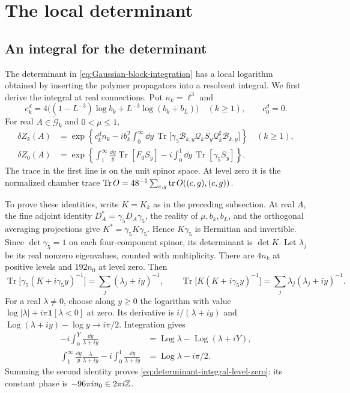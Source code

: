 \section{The local determinant}\label{sec:local-determinant}

\subsection{An integral for the determinant}\label{subsec:determinant-integral}

The determinant in \eqref{eq:Gaussian-block-integration} has a local
logarithm obtained by inserting the polymer propagators into a
resolvent integral. We first derive the integral at real connections.
Put $n_k=\ell^3$ and
\[
 c_k^d=4\bigl((1-L^{-3})\log b_k+L^{-3}\log(b_k+b_L)\bigr)
       \quad(k\ge1),\qquad c_0^d=0.
\]
For real $A\in\widetilde{\mathcal G}_k$ and $0<\mu\le1$,
\begin{align}
 \delta Z_k(A)
  &=\exp\left\{c_k^dn_k-ib_k^2\int_0^\infty\dd y\,
       \operatorname{Tr}\bigl[\gamma_5\mathcal B_{k,y}
          \mathcal Q_kS_y\mathcal Q_k^\sharp\mathcal B_{k,y}\bigr]
                        \right\}\quad(k\ge1),
                                    \label{eq:determinant-integral-positive-level}\\
 \delta Z_0(A)
  &=\exp\left\{\int_1^\infty\frac{\dd y}{y}
                       \operatorname{Tr}[F_0S_y]
             -i\int_0^1\dd y\,\operatorname{Tr}[\gamma_5S_y]
                        \right\}.\label{eq:determinant-integral-level-zero}
\end{align}
The trace in the first line is on the unit spinor space. At level
zero it is the normalized chamber trace
$\operatorname{Tr}O=48^{-1}\sum_{c,g}\operatorname{tr} O((c,g),(c,g))$.

To prove these identities, write $K=K_k$ as in the preceding
subsection. At real $A$, the fine adjoint identity
$D_A^*=\gamma_5D_A\gamma_5$, the reality of $\mu,b_k,b_L$, and
the orthogonal averaging projections give
$K^*=\gamma_5K\gamma_5$. Hence $K\gamma_5$ is Hermitian and
invertible. Since $\det\gamma_5=1$ on each four-component spinor,
its determinant is $\det K$. Let $\lambda_j$ be its real nonzero
eigenvalues, counted with multiplicity. There are $4n_k$ at positive
levels and $192n_0$ at level zero. Then
\[
 \operatorname{Tr}\bigl[\gamma_5(K+i\gamma_5y)^{-1}\bigr]
        =\sum_j(\lambda_j+iy)^{-1},\qquad
 \operatorname{Tr}\bigl[K(K+i\gamma_5y)^{-1}\bigr]
        =\sum_j\lambda_j(\lambda_j+iy)^{-1}.
\]
For a real $\lambda\ne0$, choose along $y\ge0$ the logarithm
with value $\log|\lambda|+i\pi\mathbf1[\lambda<0]$ at zero.
Its derivative is $i/(\lambda+iy)$ and
$\operatorname{Log}(\lambda+iy)-\log y\to i\pi/2$.
Integration gives
\begin{align*}
 -i\int_0^Y\frac{\dd y}{\lambda+iy}
        &=\operatorname{Log}\lambda-
                          \operatorname{Log}(\lambda+iY),\\
 \int_1^\infty\frac{\dd y}{y}\frac{\lambda}{\lambda+iy}
       -i\int_0^1\frac{\dd y}{\lambda+iy}
        &=\operatorname{Log}\lambda-i\pi/2.
\end{align*}
Summing the second identity proves
\eqref{eq:determinant-integral-level-zero}: its constant phase is
$-96\pi i n_0\in2\pi i\mathbb Z$.

